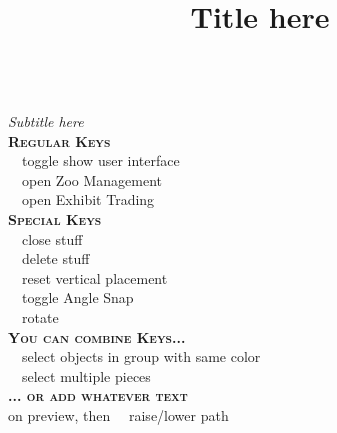 \documentclass[12pt,twoside]{article}
\title{Title here}
\makeatletter
\newcommand{\command}[2]{#1~\dotfill{}~#2\\} %
\newcommand{\sectiontitle}[1]{\textsc{\textbf{#1}} \ \textcolor{DarkGray}{\hrulefill}\\} %
\renewcommand{\maketitle}{{\centering{\Large\bfseries\@title}}\\}
\makeatother
\begin{document}
\begin{multicols*}{3}

\maketitle
\emph{Subtitle here}\\

\sectiontitle{Regular Keys}
\command{}{toggle show user interface}
\command{}{open Zoo Management}
\command{}{open Exhibit Trading}

\sectiontitle{Special Keys}
\command{\keys{\esc}}{close stuff}
\command{\keys{\del}}{delete stuff}
\command{\keys{\shift}}{reset vertical placement}
\command{\keys{\SPACE}}{toggle Angle Snap}
\command{\keys{\arrowkeyleft/\arrowkeyright}}{rotate}

\sectiontitle{You can combine Keys...}
\command{}{select objects in group with same color}
\command{}{select multiple pieces}

\sectiontitle{... or add whatever text}
\command{ on preview, then \keys{\arrowkeyup/\arrowkeydown}}{raise/lower path}

\end{multicols*}
\end{document}
